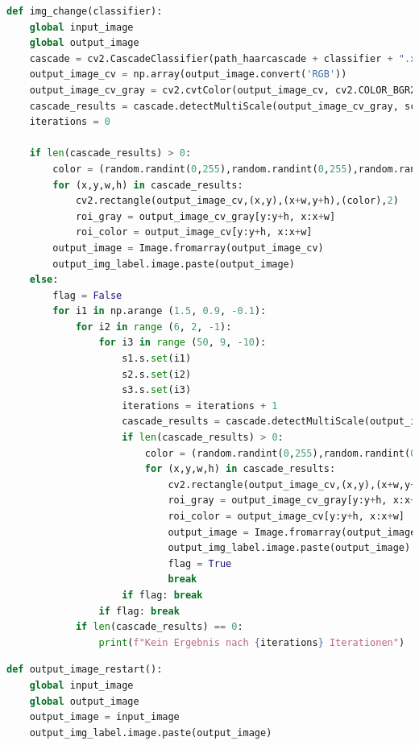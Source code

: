 \documentclass{article}
\begin{document}


\begin{lstlisting}[language=Python]
def img_change(classifier):
	global input_image
	global output_image
	cascade = cv2.CascadeClassifier(path_haarcascade + classifier + ".xml")
	output_image_cv = np.array(output_image.convert('RGB'))
	output_image_cv_gray = cv2.cvtColor(output_image_cv, cv2.COLOR_BGR2GRAY)
	cascade_results = cascade.detectMultiScale(output_image_cv_gray, scaleFactor=s1.get_val(), minNeighbors = s2.get_val(), minSize=(s3.get_val(), s3.get_val())) 
	iterations = 0

	if len(cascade_results) > 0:
		color = (random.randint(0,255),random.randint(0,255),random.randint(0,255))
		for (x,y,w,h) in cascade_results:
			cv2.rectangle(output_image_cv,(x,y),(x+w,y+h),(color),2)
			roi_gray = output_image_cv_gray[y:y+h, x:x+w]
			roi_color = output_image_cv[y:y+h, x:x+w]
		output_image = Image.fromarray(output_image_cv) 
		output_img_label.image.paste(output_image)
	else:
		flag = False
		for i1 in np.arange (1.5, 0.9, -0.1):
			for i2 in range (6, 2, -1):
				for i3 in range (50, 9, -10):                 
					s1.s.set(i1)
					s2.s.set(i2)
					s3.s.set(i3)
					iterations = iterations + 1
					cascade_results = cascade.detectMultiScale(output_image_cv_gray, scaleFactor=s1.get_val(), minNeighbors = s2.get_val(), minSize=(s3.get_val(), s3.get_val()))
					if len(cascade_results) > 0:
						color = (random.randint(0,255),random.randint(0,255),random.randint(0,255))
						for (x,y,w,h) in cascade_results:
							cv2.rectangle(output_image_cv,(x,y),(x+w,y+h),(color),2)
							roi_gray = output_image_cv_gray[y:y+h, x:x+w]
							roi_color = output_image_cv[y:y+h, x:x+w]
							output_image = Image.fromarray(output_image_cv)
							output_img_label.image.paste(output_image)
							flag = True
							break
					if flag: break
				if flag: break
			if len(cascade_results) == 0:
				print(f"Kein Ergebnis nach {iterations} Iterationen")          
\end{lstlisting}



\begin{lstlisting}[language=Python]
def output_image_restart():
	global input_image
	global output_image
	output_image = input_image
	output_img_label.image.paste(output_image)
\end{lstlisting}
\end{document}
